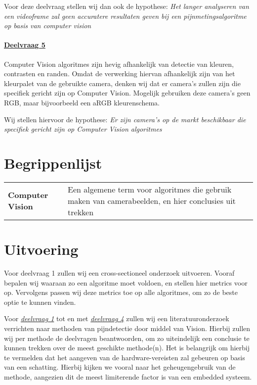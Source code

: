 \documentclass[11pt]{article}
\begin{document}
    Voor deze deelvraag stellen wij dan ook de hypothese: \emph{Het langer analyseren van een videoframe zal geen accuratere resultaten geven bij een pijnmetingsalgoritme op basis van computer vision}

    \paragraph{\hyperref[itm:dv5]{Deelvraag 5}}
    Computer Vision algoritmes zijn hevig afhankelijk van detectie van kleuren, contrasten en randen.
    Omdat de verwerking hiervan afhankelijk zijn van het kleurpalet van de gebruikte camera, denken wij dat er camera's zullen zijn die specifiek gericht zijn op Computer Vision.
    Mogelijk gebruiken deze camera's geen RGB, maar bijvoorbeeld een aRGB kleurenschema.

    Wij stellen hiervoor de hypothese: \emph{Er zijn camera's op de markt beschikbaar die specifiek gericht zijn op Computer Vision algoritmes}


    \section{Begrippenlijst}
    \begin{tabular}{p{10em} p{21em}}
        \textbf{Computer Vision} & Een algemene term voor algoritmes die gebruik maken van camerabeelden, en hier conclusies uit trekken\\

    \end{tabular}


    \section{Uitvoering}
    Voor deelvraag 1 zullen wij een cross-sectioneel onderzoek uitvoeren.
    Vooraf bepalen wij waaraan zo een algoritme moet voldoen, en stellen hier metrics voor op.
    Vervolgens passen wij deze metrics toe op alle algoritmes, om zo de beste optie te kunnen vinden.

    Voor \emph{\hyperref[itm:dv1]{deelvraag 1}} tot en met \emph{\hyperref[itm:dv4]{deelvraag 4}} zullen wij een literatuuronderzoek
    verrichten naar methoden van pijndetectie door middel van Vision.
    Hierbij zullen wij per methode de deelvragen beantwoorden, om zo uiteindelijk een conclusie te kunnen trekken over
    de meest geschikte methode(n).
    Het is belangrijk om hierbij te vermelden dat het aangeven van de hardware-vereisten
    zal gebeuren op basis van een schatting.
    Hierbij kijken we vooral naar het geheugengebruik van de methode,
    aangezien dit de meest limiterende factor is van een embedded systeem.
\end{document}
